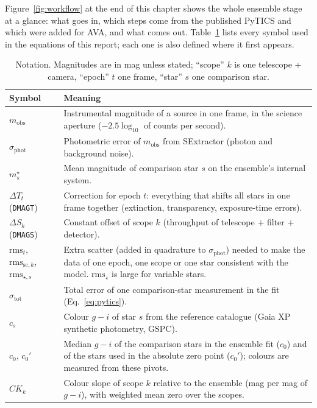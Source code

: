 \documentclass[10pt,a4paper,oneside]{report}
\renewcommand{\_}{\oldunderscore\allowbreak}
\begin{document}
Figure~\ref{fig:workflow} at the end of this chapter shows the whole ensemble stage at a glance: what
goes in, which steps come from the published PyTICS and which were added for AVA, and what comes out.
Table~\ref{tab:notation} lists every symbol used in the equations of this report; each one is also
defined where it first appears.

\begin{table}[!htbp]
\centering
\caption{Notation. Magnitudes are in mag unless stated; ``scope'' $k$ is one telescope + camera, ``epoch''
  $t$ one frame, ``star'' $s$ one comparison star.}
\label{tab:notation}
\small
\begin{tabularx}{\textwidth}{lX}
\toprule
Symbol & Meaning \\
\midrule
$m_\mathrm{obs}$ & Instrumental magnitude of a source in one frame, in the science aperture
  ($-2.5\log_{10}$ of counts per second). \\
$\sigma_\mathrm{phot}$ & Photometric error of $m_\mathrm{obs}$ from SExtractor (photon and background noise). \\
$m^\star_s$ & Mean magnitude of comparison star $s$ on the ensemble's internal system. \\
$\Delta T_t$ (\texttt{DMAGT}) & Correction for epoch $t$: everything that shifts all stars in one frame
  together (extinction, transparency, exposure-time errors). \\
$\Delta S_k$ (\texttt{DMAGS}) & Constant offset of scope $k$ (throughput of telescope + filter + detector). \\
$\mathrm{rms}_t$, $\mathrm{rms}_{\mathrm{sc},k}$, $\mathrm{rms}_{\star,s}$ & Extra scatter (added in
  quadrature to $\sigma_\mathrm{phot}$) needed to make the data of one epoch, one scope or one star
  consistent with the model. $\mathrm{rms}_\star$ is large for variable stars. \\
$\sigma_\mathrm{tot}$ & Total error of one comparison-star measurement in the fit (Eq.~\ref{eq:pytics}). \\
$c_s$ & Colour $g-i$ of star $s$ from the reference catalogue (Gaia XP synthetic photometry, GSPC). \\
$c_0$, $c_0'$ & Median $g-i$ of the comparison stars in the ensemble fit ($c_0$) and of the stars used in
  the absolute zero point ($c_0'$); colours are measured from these pivots. \\
$CK_k$ & Colour slope of scope $k$ relative to the ensemble (mag per mag of $g-i$), with weighted mean zero over the scopes. \\

\end{tabularx}
\end{table}
\end{document}
